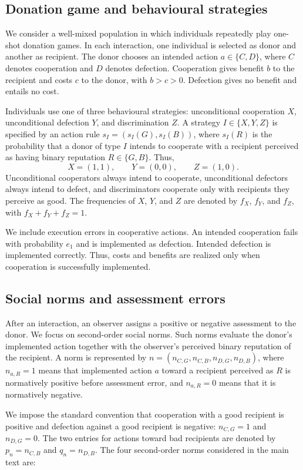\documentclass[fleqn,10pt]{wlscirep}
\begin{document}
\subsection*{Donation game and behavioural strategies}

We consider a well-mixed population in which individuals repeatedly play one-shot donation games. In each interaction, one individual is selected as donor and another as recipient. The donor chooses an intended action $a\in\{C,D\}$, where $C$ denotes cooperation and $D$ denotes defection. Cooperation gives benefit $b$ to the recipient and costs $c$ to the donor, with $b>c>0$. Defection gives no benefit and entails no cost.

Individuals use one of three behavioural strategies: unconditional cooperation $X$, unconditional defection $Y$, and discrimination $Z$. A strategy $I\in\{X,Y,Z\}$ is specified by an action rule $s_I=(s_I(G),s_I(B))$, where $s_I(R)$ is the probability that a donor of type $I$ intends to cooperate with a recipient perceived as having binary reputation $R\in\{G,B\}$. Thus,
\[
X=(1,1),\qquad Y=(0,0),\qquad Z=(1,0).
\]
Unconditional cooperators always intend to cooperate, unconditional defectors always intend to defect, and discriminators cooperate only with recipients they perceive as good. The frequencies of $X$, $Y$, and $Z$ are denoted by $f_X$, $f_Y$, and $f_Z$, with $f_X+f_Y+f_Z=1$.

We include execution errors in cooperative actions. An intended cooperation fails with probability $e_1$ and is implemented as defection. Intended defection is implemented correctly. Thus, costs and benefits are realized only when cooperation is successfully implemented.

\subsection*{Social norms and assessment errors}

After an interaction, an observer assigns a positive or negative assessment to the donor. We focus on second-order social norms. Such norms evaluate the donor's implemented action together with the observer's perceived binary reputation of the recipient. A norm is represented by $n=(n_{C,G},n_{C,B},n_{D,G},n_{D,B})$, where $n_{a,R}=1$ means that implemented action $a$ toward a recipient perceived as $R$ is normatively positive before assessment error, and $n_{a,R}=0$ means that it is normatively negative.

We impose the standard convention that cooperation with a good recipient is positive and defection against a good recipient is negative: $n_{C,G}=1$ and $n_{D,G}=0$. The two entries for actions toward bad recipients are denoted by $p_n=n_{C,B}$ and $q_n=n_{D,B}$. The four second-order norms considered in the main text are:
\end{document}
